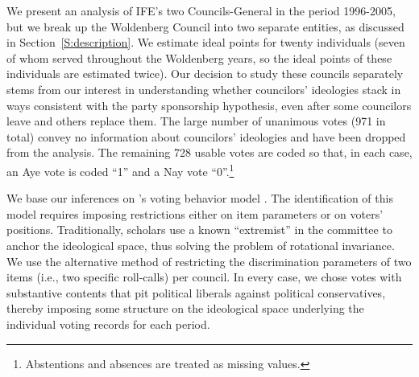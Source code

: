 \documentclass[12 pt, letter]{article}
\begin{document}
We present an analysis of IFE's two Councils-General in the period
1996-2005, but we break up the Woldenberg Council into two separate
entities, as discussed in Section~\ref{S:description}.  We estimate
ideal points for twenty individuals (seven of whom served throughout
the Woldenberg years, so the ideal points of these individuals are
estimated twice).  Our decision to study these councils separately
stems from our interest in understanding whether councilors'
ideologies stack in ways consistent with the party sponsorship
hypothesis, even after some councilors leave and others replace
them. The large number of unanimous votes (971 in total) convey no
information about councilors' ideologies and have been dropped from
the analysis.  The remaining 728 usable votes are coded so that, in
each case, an Aye vote is coded ``1'' and a Nay vote
``0''.\footnote{Abstentions and absences are treated as missing
values.}


We base our inferences on \citeauthor*{Clinton2004}'s voting
behavior model \citep{Clinton2004, Martin2002}.  The identification
of this model requires imposing restrictions either on item
parameters or on voters' positions.  Traditionally, scholars use a
known ``extremist'' in the committee to anchor the ideological
space, thus solving the problem of rotational invariance.  We use
the alternative method of restricting the discrimination parameters
of two items (i.e., two specific roll-calls) per council. In every
case, we chose votes with substantive contents that pit political
liberals against political conservatives, thereby imposing some
structure on the ideological space underlying the individual voting
records for each period.
\end{document}
